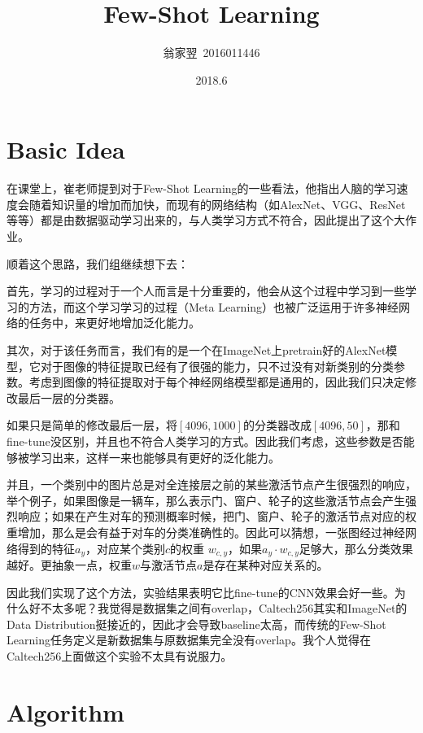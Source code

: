 \documentclass[a4paper]{article}
\title{\bf Few-Shot Learning}
\date{2018.6}
\author{翁家翌~2016011446}
\begin{document}
\kaishu
\ttfamily
\maketitle
\tableofcontents
\section{Basic Idea}

在课堂上，崔老师提到对于Few-Shot Learning\cite{fewshot}的一些看法，他指出人脑的学习速度会随着知识量的增加而加快，而现有的网络结构（如AlexNet\cite{alexnet}、VGG\cite{vgg}、ResNet\cite{resnet}等等）都是由数据驱动学习出来的，与人类学习方式不符合，因此提出了这个大作业。

顺着这个思路，我们组继续想下去：

首先，学习的过程对于一个人而言是十分重要的，他会从这个过程中学习到一些学习的方法，而这个学习学习的过程（Meta Learning\cite{maml}）也被广泛运用于许多神经网络的任务中，来更好地增加泛化能力。

其次，对于该任务而言，我们有的是一个在ImageNet\cite{imagenet}上pretrain好的AlexNet\cite{alexnet}模型，它对于图像的特征提取已经有了很强的能力，只不过没有对新类别的分类参数。考虑到图像的特征提取对于每个神经网络模型都是通用的，因此我们只决定修改最后一层的分类器。

如果只是简单的修改最后一层，将$[4096,1000]$的分类器改成$[4096,50]$，那和fine-tune没区别，并且也不符合人类学习的方式。因此我们考虑，这些参数是否能够被学习出来，这样一来也能够具有更好的泛化能力。

并且，一个类别中的图片总是对全连接层之前的某些激活节点产生很强烈的响应，举个例子，如果图像是一辆车，那么表示门、窗户、轮子的这些激活节点会产生强烈响应；如果在产生对车的预测概率时候，把门、窗户、轮子的激活节点对应的权重增加，那么是会有益于对车的分类准确性的。因此可以猜想，一张图经过神经网络得到的特征$a_y$，对应某个类别$c$的权重 $w_{c,y}$，如果$a_y\cdot w_{c,y}$足够大，那么分类效果越好。更抽象一点，权重$w$与激活节点$a$是存在某种对应关系的。

因此我们实现了这个方法，实验结果表明它比fine-tune的CNN效果会好一些。为什么好不太多呢？我觉得是数据集之间有overlap，Caltech256\cite{caltech256}其实和ImageNet的Data Distribution挺接近的，因此才会导致baseline太高，而传统的Few-Shot Learning任务定义是新数据集与原数据集完全没有overlap。我个人觉得在Caltech256上面做这个实验不太具有说服力。

\section{Algorithm}
\end{document}
